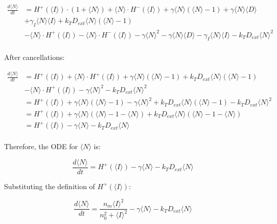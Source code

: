 \documentclass{article}
\begin{document}
\begin{flushleft}
\begin{align*}
\frac{d\langle N \rangle}{dt} &= H^+(\langle I \rangle) \cdot (1 + \langle N \rangle) + \langle N \rangle \cdot H^-(\langle I \rangle) + \gamma \langle N \rangle (\langle N \rangle - 1) + \gamma \langle N \rangle \langle D \rangle \\
&+ \gamma_I \langle N \rangle \langle I \rangle + k_T D_{ext} \langle N \rangle (\langle N \rangle - 1) \\
&- \langle N \rangle \cdot H^+(\langle I \rangle) - \langle N \rangle \cdot H^-(\langle I \rangle) - \gamma \langle N \rangle^2 - \gamma \langle N \rangle \langle D \rangle - \gamma_I \langle N \rangle \langle I \rangle - k_T D_{ext} \langle N \rangle^2 \\
\end{align*}

After cancellations:

\begin{align*}
\frac{d\langle N \rangle}{dt} &= H^+(\langle I \rangle) + \langle N \rangle \cdot H^+(\langle I \rangle) + \gamma \langle N \rangle (\langle N \rangle - 1) + k_T D_{ext} \langle N \rangle (\langle N \rangle - 1) \\
&- \langle N \rangle \cdot H^+(\langle I \rangle) - \gamma \langle N \rangle^2 - k_T D_{ext} \langle N \rangle^2 \\
&= H^+(\langle I \rangle) + \gamma \langle N \rangle (\langle N \rangle - 1) - \gamma \langle N \rangle^2 + k_T D_{ext} \langle N \rangle (\langle N \rangle - 1) - k_T D_{ext} \langle N \rangle^2 \\
&= H^+(\langle I \rangle) + \gamma \langle N \rangle (\langle N \rangle - 1 - \langle N \rangle) + k_T D_{ext} \langle N \rangle (\langle N \rangle - 1 - \langle N \rangle) \\
&= H^+(\langle I \rangle) - \gamma \langle N \rangle - k_T D_{ext} \langle N \rangle \\
\end{align*}

Therefore, the ODE for $\langle N \rangle$ is:

\[
\frac{d\langle N \rangle}{dt} = H^+(\langle I \rangle) - \gamma \langle N \rangle - k_T D_{ext} \langle N \rangle
\]

Substituting the definition of $H^+(\langle I \rangle)$:

\[
\frac{d\langle N \rangle}{dt} = \frac{n_m \langle I \rangle^2}{n_0^2 + \langle I \rangle^2} - \gamma \langle N \rangle - k_T D_{ext} \langle N \rangle
\]


\end{flushleft}
\end{document}
